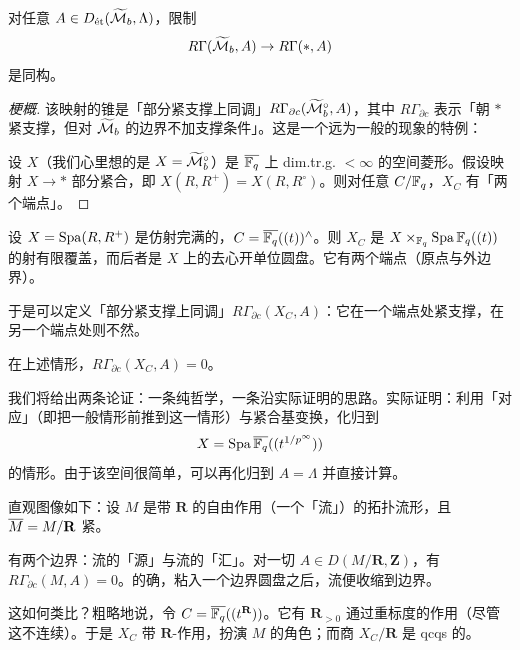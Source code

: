 \begin{theorem}
对任意 $A\in D_{\et}(\wt\cM_b,\Lambda)$，限制
\[
R\Gamma(\wt\cM_b,A)\to R\Gamma(\ast,A)
\]
是同构。
\end{theorem}

\begin{proof}[梗概]
该映射的锥是「部分紧支撑上同调」$R\Gamma_{\partial c}(\wt\cM_b^\circ,A)$，其中 $R\Gamma_{\partial c}$ 表示「朝 $\ast$ 紧支撑，但对 $\wt\cM_b$ 的边界不加支撑条件」。这是一个远为一般的现象的特例：

设 $X$（我们心里想的是 $X=\wt\cM_b^\circ$）是 $\ol{\Fq}$ 上 dim.tr.g. $<\infty$ 的空间菱形。假设映射 $X\to\ast$ 部分紧合，即 $X(R,R^+)=X(R,R^\circ)$。则对任意 $C/\Fq$，$X_C$ 有「两个端点」。
\end{proof}

\begin{example}
设 $X=\Spa(R,R^+)$ 是仿射完满的，$C=\ol{\Fq}((t))^{\wedge}$。则 $X_C$ 是 $X\times_{\Fq}\Spa\Fq((t))$ 的射有限覆盖，而后者是 $X$ 上的去心开单位圆盘。它有两个端点（原点与外边界）。
\end{example}

\begin{center}
\end{center}

于是可以定义「部分紧支撑上同调」$R\Gamma_{\partial c}(X_C,A)$：它在一个端点处紧支撑，在另一个端点处则不然。

\begin{theorem}
在上述情形，$R\Gamma_{\partial c}(X_C,A)=0$。
\end{theorem}

我们将给出两条论证：一条纯哲学，一条沿实际证明的思路。实际证明：利用「对应」（即把一般情形前推到这一情形）与紧合基变换，化归到
\[
X=\Spa\ol{\Fq}((t^{1/p^\infty}))
\]
的情形。由于该空间很简单，可以再化归到 $A=\Lambda$ 并直接计算。

直观图像如下：设 $M$ 是带 $\mathbf{R}$ 的自由作用（一个「流」）的拓扑流形，且 $\ol M=M/\mathbf{R}$ 紧。

有两个边界：流的「源」与流的「汇」。对一切 $A\in D(M/\mathbf{R},\mathbf{Z})$，有 $R\Gamma_{\partial c}(M,A)=0$。的确，粘入一个边界圆盘之后，流便收缩到边界。

这如何类比？粗略地说，令 $C=\ol{\Fq}((t^{\mathbf{R}}))$。它有 $\mathbf{R}_{>0}$ 通过重标度的作用（尽管这不连续）。于是 $X_C$ 带 $\mathbf{R}$-作用，扮演 $M$ 的角色；而商 $X_C/\mathbf{R}$ 是 qcqs 的。
